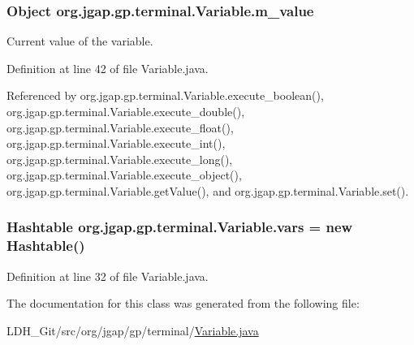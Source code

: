 \hypertarget{classorg_1_1jgap_1_1gp_1_1terminal_1_1_variable_a523186af0a38d1e5dbe8e154be2915e9}{
\subsubsection[{m\-\_\-value}]{\setlength{\rightskip}{0pt plus 5cm}Object org.\-jgap.\-gp.\-terminal.\-Variable.\-m\-\_\-value\hspace{0.3cm}{\ttfamily [private]}}}\label{classorg_1_1jgap_1_1gp_1_1terminal_1_1_variable_a523186af0a38d1e5dbe8e154be2915e9}
Current value of the variable. 

Definition at line 42 of file Variable.\-java.



Referenced by org.\-jgap.\-gp.\-terminal.\-Variable.\-execute\-\_\-boolean(), org.\-jgap.\-gp.\-terminal.\-Variable.\-execute\-\_\-double(), org.\-jgap.\-gp.\-terminal.\-Variable.\-execute\-\_\-float(), org.\-jgap.\-gp.\-terminal.\-Variable.\-execute\-\_\-int(), org.\-jgap.\-gp.\-terminal.\-Variable.\-execute\-\_\-long(), org.\-jgap.\-gp.\-terminal.\-Variable.\-execute\-\_\-object(), org.\-jgap.\-gp.\-terminal.\-Variable.\-get\-Value(), and org.\-jgap.\-gp.\-terminal.\-Variable.\-set().

\hypertarget{classorg_1_1jgap_1_1gp_1_1terminal_1_1_variable_a0769a63a84719d7d8cca630ea4b902d0}{
\subsubsection[{vars}]{\setlength{\rightskip}{0pt plus 5cm}Hashtable org.\-jgap.\-gp.\-terminal.\-Variable.\-vars = new Hashtable()\hspace{0.3cm}{\ttfamily [static]}}}\label{classorg_1_1jgap_1_1gp_1_1terminal_1_1_variable_a0769a63a84719d7d8cca630ea4b902d0}


Definition at line 32 of file Variable.\-java.



The documentation for this class was generated from the following file\-:\begin{DoxyCompactItemize}
\item 
L\-D\-H\-\_\-\-Git/src/org/jgap/gp/terminal/\hyperlink{_variable_8java}{Variable.\-java}\end{DoxyCompactItemize}
